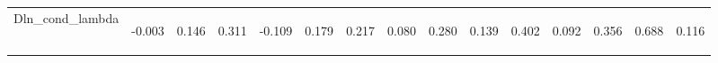 \begin{center}
\begin{tabular}{lcccccccccccccc}
\noalign{\smallskip}Dln_cond_lambda & \begin{normalsize}-0.003\end{normalsize} & \begin{normalsize}0.146\end{normalsize} & \begin{normalsize}0.311\end{normalsize} & \begin{normalsize}-0.109\end{normalsize} & \begin{normalsize}0.179\end{normalsize} & \begin{normalsize}0.217\end{normalsize} & \begin{normalsize}0.080\end{normalsize} & \begin{normalsize}0.280\end{normalsize} & \begin{normalsize}0.139\end{normalsize} & \begin{normalsize}0.402\end{normalsize} & \begin{normalsize}0.092\end{normalsize} & \begin{normalsize}0.356\end{normalsize} & \begin{normalsize}0.688\end{normalsize} & \begin{normalsize}0.116\end{normalsize}\\

\end{tabular}
\end{center}
